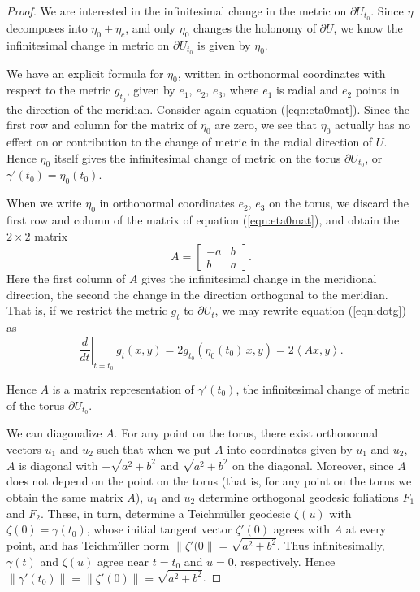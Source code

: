 \begin{proof}
We are interested in the infinitesimal change in the metric on
$\partial U_{t_0}$.  Since $\eta$ decomposes into $\eta_0 + \eta_c$,
and only $\eta_0$ changes the holonomy of $\partial U$, we know the
infinitesimal change in metric on $\partial U_{t_0}$ is given by
$\eta_0$.

We have an explicit formula for $\eta_0$, written in orthonormal
coordinates with respect to the metric $g_{t_0}$, given by $e_1$,
$e_2$, $e_3$, where $e_1$ is radial and $e_2$ points in the direction
of the meridian.  Consider again equation (\ref{eqn:eta0mat}).  Since
the first row and column for the matrix of $\eta_0$ are zero, we see
that $\eta_0$ actually has no effect on or contribution to the change
of metric in the radial direction of $U$.  Hence $\eta_0$ itself gives
the infinitesimal change of metric on the torus $\partial U_{t_0}$, or
$\gamma'(t_0) = \eta_0(t_0)$.  

When we write $\eta_0$ in orthonormal coordinates $e_2$, $e_3$ on the
torus, we discard the first row and column of the matrix of equation
(\ref{eqn:eta0mat}), and obtain the $2\times 2$ matrix
\begin{equation}
A = \left[\begin{array}{cc}-a&b\\b&a\end{array}\right].
\label{eqn:define-A}
\end{equation}
Here the
first column of $A$ gives the infinitesimal change in the meridional
direction, the second the change in the direction orthogonal to the
meridian.  That is, if we restrict the metric $g_t$ to
$\partial U_t$, we may rewrite equation (\ref{eqn:dotg}) as
$$\left.\frac{d}{dt}\right|_{t=t_0}\, g_t(x,y) =
2g_{t_0}(\eta_0(t_0)\,x, y) = 2\left<Ax, y\right>.$$

Hence $A$ is a matrix representation of $\gamma'(t_0)$, the
infinitesimal change of metric of the torus $\partial U_{t_0}$.

We can diagonalize $A$.  For any point on the torus, there exist
orthonormal vectors $u_1$ and $u_2$ such that when we put $A$ into
coordinates given by $u_1$ and $u_2$, $A$ is diagonal with
$-\sqrt{a^2+b^2}$ and $\sqrt{a^2+b^2}$ on the diagonal.  Moreover,
since $A$ does not depend on the point on the torus (that is, for any
point on the torus we obtain the same matrix $A$), $u_1$ and $u_2$
determine orthogonal geodesic foliations $F_1$ and $F_2$.  These, in
turn, determine a Teichm\"uller geodesic $\zeta(u)$ with $\zeta(0) =
\gamma(t_0)$, whose initial tangent vector $\zeta'(0)$ agrees with $A$
at every point, and has Teichm\"uller norm $\|\zeta'(0\| =
\sqrt{a^2+b^2}$.  Thus infinitesimally, $\gamma(t)$ and $\zeta(u)$
agree near $t=t_0$ and $u=0$, respectively.  Hence $\|\gamma'(t_0)\| =
\|\zeta'(0)\| = \sqrt{a^2+b^2}$.
\end{proof}

